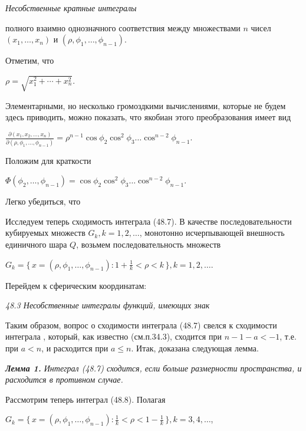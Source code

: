 ﻿\documentclass[12pt]{book}
\begin{document}
\slshape{Несобственные кратные интегралы}

полного взаимно однозначного соответствия между множествами $n$ чисел $(x_1,\ldots,x_n)$ и $(\rho,\phi_1,\ldots,\phi_{n-1})$.

Отметим, что
\begin{center}
$\rho = \sqrt{x_1^2+\cdots+x_n^2}$.
\end{center}
Элементарными, но несколько громоздкими вычислениями, которые не будем здесь приводить, можно показать, что якобиан этого преобразования имеет вид
\begin{center}
$\frac{\partial(x_1,x_2,\ldots,x_n)}{\partial(\rho,\phi_1,\ldots,\phi_{n-1})} = \rho^{n-1}\cos{\phi_2}\cos^2{\phi_3}\ldots\cos^{n-2}{\phi_{n-1}}$.
\end{center}
Положим для краткости
\begin{center}
$\Phi(\phi_2,\ldots,\phi_{n-1}) = \cos{\phi_2}\cos^2{\phi_3\ldots\cos^{n-2}{\phi_{n-1}}}$.
\end{center}
Легко убедиться, что


Исследуем теперь сходимость интеграла (48.7). В качестве последовательности кубируемых множеств $G_k, k = 1, 2,\ldots$,
монотонно исчерпывающей внешность единичного шара $Q$, возьмем последовательность множеств

\begin{center}
$G_k = \{\,x = (\rho,\phi_1,\ldots,\phi_{n-1}):1 + \frac1k < \rho < k\,\}, k = 1,2,\ldots$.
\end{center}

Перейдем к сферическим координатам:


\slshape{48.3 Несобственные интегралы функций, имеющих знак}


Таким образом, вопрос о сходимости интеграла (48.7) свелся к сходимости интеграла %
, который, как известно (см.п.34.3), сходится при $n - 1 - a < -1$, т.е. при $a < n$, и расходится при $a\le n$. Итак, доказана следующая лемма.

\slshape{{\bfseries{Лемма 1.}} Интеграл (48.7) сходится, если %
больше размерности пространства, и расходится в противном случае.}

Рассмотрим теперь интеграл (48.8). Полагая

\begin{center}
$G_k = \{\,x = (\rho,\phi_1,\ldots,\phi_{n-1}):\frac1k < \rho < 1 - \frac1k\,\}, k = 3,4,\ldots$,
\end{center}
\end{document}
